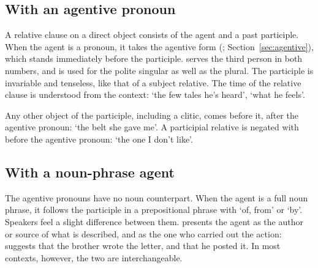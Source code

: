 \subsection{With an agentive pronoun}
A relative clause on a direct object consists of the agent and a past participle. When the agent is a pronoun, it takes the agentive form (; Section~\ref{sec:agentive}), which stands immediately before the participle.  serves the third person in both numbers, and  is used for the polite singular as well as the plural.
The participle is invariable and tenseless, like that of a subject relative. The time of the relative clause is understood from the context:  `the few tales he's heard',  `what he feels'.

Any other object of the participle, including a clitic, comes before it, after the agentive pronoun:  `the belt she gave me'. A participial relative is negated with  before the agentive pronoun:  `the one I don't like'.

\subsection{With a noun-phrase agent}
The agentive pronouns have no noun counterpart. When the agent is a full noun phrase, it follows the participle in a prepositional phrase with  `of, from' or  `by'. Speakers feel a slight difference between them.  presents the agent as the author or source of what is described, and  as the one who carried out the action:  suggests that the brother wrote the letter, and  that he posted it. In most contexts, however, the two are interchangeable.

